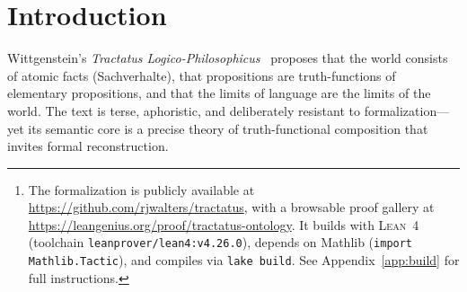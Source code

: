 \documentclass[jsl,bibother]{asl}
\theoremstyle{definition}
\theoremstyle{remark}
\newcommand{\Lean}{\textsc{Lean}}
\begin{document}
\begin{abstract}
These results yield a formal decomposition of the \emph{Tractatus}
into invariants, assumptions, and limits, and provide a precise
characterization of the saying/showing distinction as a theorem
about expressibility in truth-functional languages.
The formalization comprises 2,296 lines of \Lean~4, proves 80
formally verified results with 0 \texttt{sorry} obligations
and 1 deliberate axiom (\texttt{axiom silence : True}, encoding
TLP~7).%
\footnote{The formalization is publicly available at
  \url{https://github.com/rjwalters/tractatus},
  with a browsable proof gallery at
  \url{https://leangenius.org/proof/tractatus-ontology}.
  It builds with \Lean~4 (toolchain \texttt{leanprover/lean4:v4.26.0}),
  depends on Mathlib (\texttt{import Mathlib.Tactic}), and compiles via
  \texttt{lake build}.  See Appendix~\ref{app:build} for full
  instructions.}
\end{abstract}

\maketitle

\section{Introduction}
\label{sec:intro}

Wittgenstein's \emph{Tractatus Logico-Philosophicus}~\cite{wittgenstein1921}
proposes that the world consists of atomic facts (Sachverhalte),
that propositions are truth-functions of elementary propositions,
and that the limits of language are the limits of the world.
The text is terse, aphoristic, and deliberately resistant to
formalization---yet its semantic core is a precise theory of
truth-functional composition that invites formal reconstruction.
\end{document}
